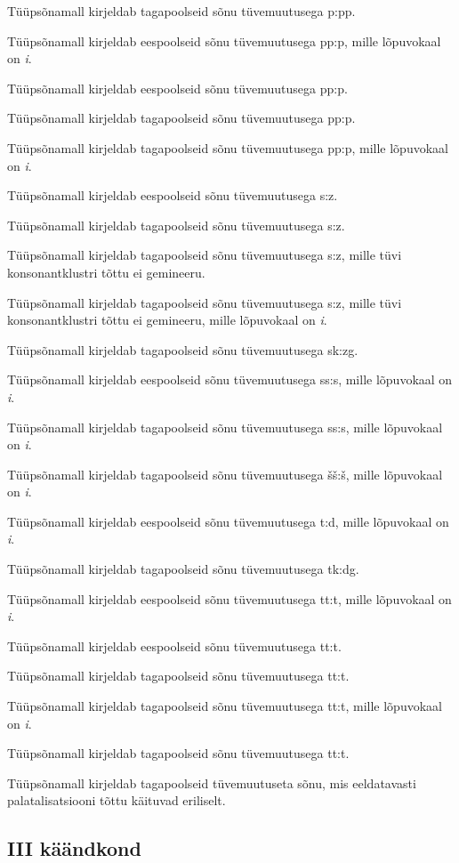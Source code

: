 \documentclass[12pt,a4paper]{article}
\begin{document}

Tüüpsõna\-mall kirjeldab tagapoolseid sõnu tüvemuutusega p:pp.

Tüüpsõna\-mall kirjeldab eespoolseid sõnu tüvemuutusega pp:p, mille lõpuvokaal on \textit{i}.

Tüüpsõna\-mall kirjeldab eespoolseid sõnu tüvemuutusega pp:p.

Tüüpsõna\-mall kirjeldab tagapoolseid sõnu tüvemuutusega pp:p.

Tüüpsõna\-mall kirjeldab tagapoolseid sõnu tüvemuutusega pp:p, mille lõpuvokaal on \textit{i}.

Tüüpsõna\-mall kirjeldab eespoolseid sõnu tüvemuutusega s:z.

Tüüpsõna\-mall kirjeldab tagapoolseid sõnu tüvemuutusega s:z.

Tüüpsõna\-mall kirjeldab tagapoolseid sõnu tüvemuutusega s:z, mille tüvi konsonant\-klustri tõttu ei gemineeru.

Tüüpsõna\-mall kirjeldab tagapoolseid sõnu tüvemuutusega s:z, mille tüvi konsonant\-klustri tõttu ei gemineeru, mille lõpuvokaal on \textit{i}. 

Tüüpsõna\-mall kirjeldab tagapoolseid sõnu tüvemuutusega sk:zg.

Tüüpsõna\-mall kirjeldab eespoolseid sõnu tüvemuutusega ss:s, mille lõpuvokaal on \textit{i}. 

Tüüpsõna\-mall kirjeldab tagapoolseid sõnu tüvemuutusega ss:s, mille lõpuvokaal on \textit{i}. 

Tüüpsõna\-mall kirjeldab tagapoolseid sõnu tüvemuutusega šš:š, mille lõpuvokaal on \textit{i}. 

Tüüpsõna\-mall kirjeldab eespoolseid sõnu tüvemuutusega t:d, mille lõpuvokaal on \textit{i}. 

Tüüpsõna\-mall kirjeldab tagapoolseid sõnu tüvemuutusega tk:dg.

Tüüpsõna\-mall kirjeldab eespoolseid sõnu tüvemuutusega tt:t, mille lõpuvokaal on \textit{i}. 

Tüüpsõna\-mall kirjeldab eespoolseid sõnu tüvemuutusega tt:t.

Tüüpsõna\-mall kirjeldab tagapoolseid sõnu tüvemuutusega tt:t.

Tüüpsõna\-mall kirjeldab tagapoolseid sõnu tüvemuutusega tt:t, mille lõpuvokaal on \textit{i}.  

Tüüpsõna\-mall kirjeldab tagapoolseid sõnu tüvemuutusega tt:t.
%

Tüüpsõna\-mall kirjeldab tagapoolseid tüvemuutuseta sõnu, mis eeldatavasti palatalisatsiooni tõttu käituvad eriliselt.


\subsection{\RN{3} käändkond}
\end{document}
